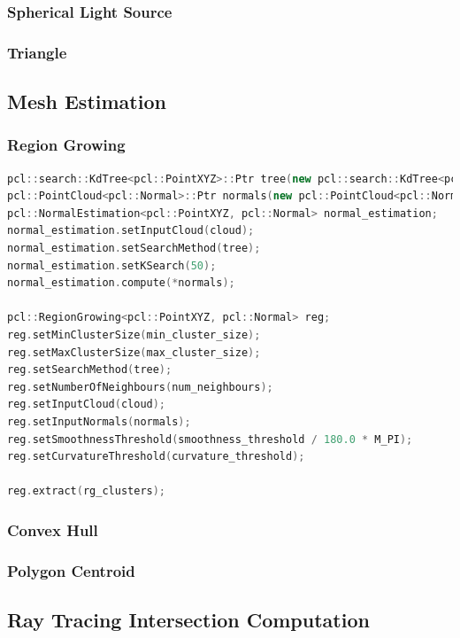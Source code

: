 \documentclass[11pt, a4paper,oneside,chapterprefix=false]{scrbook}
\begin{document}
\subsubsection{Spherical Light Source}

\subsubsection{Triangle}

\subsection{Mesh Estimation} \label{sec:mesh estimation}

\subsubsection{Region Growing}

\begin{lstlisting}[language=C++, caption=Region Growing]
pcl::search::KdTree<pcl::PointXYZ>::Ptr tree(new pcl::search::KdTree<pcl::PointXYZ>());
pcl::PointCloud<pcl::Normal>::Ptr normals(new pcl::PointCloud<pcl::Normal>);
pcl::NormalEstimation<pcl::PointXYZ, pcl::Normal> normal_estimation;
normal_estimation.setInputCloud(cloud);
normal_estimation.setSearchMethod(tree);
normal_estimation.setKSearch(50);
normal_estimation.compute(*normals);

pcl::RegionGrowing<pcl::PointXYZ, pcl::Normal> reg;
reg.setMinClusterSize(min_cluster_size);
reg.setMaxClusterSize(max_cluster_size);
reg.setSearchMethod(tree);
reg.setNumberOfNeighbours(num_neighbours);
reg.setInputCloud(cloud);
reg.setInputNormals(normals);
reg.setSmoothnessThreshold(smoothness_threshold / 180.0 * M_PI);
reg.setCurvatureThreshold(curvature_threshold);

reg.extract(rg_clusters);
\end{lstlisting}

\subsubsection{Convex Hull}

\subsubsection{Polygon Centroid}

\subsection{Ray Tracing Intersection Computation} \label{sec:ray tracing}
\end{document}
